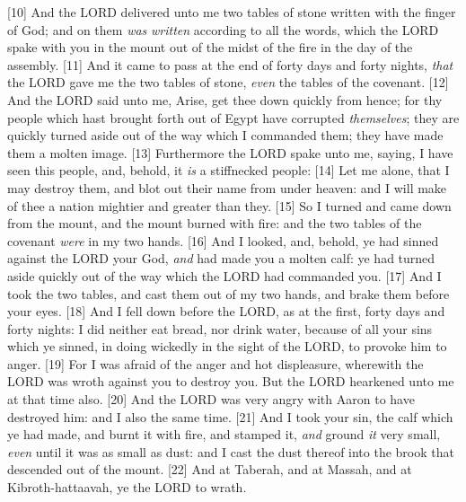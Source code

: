 [10] \textcolor[cmyk]{0.99998,1,0,0}{And the LORD delivered unto me two tables of stone written with the finger of God; and on them \emph{was} \emph{written} according to all the words, which the LORD spake with you in the mount out of the midst of the fire in the day of the assembly.}
[11] \textcolor[cmyk]{0.99998,1,0,0}{And it came to pass at the end of forty days and forty nights, \emph{that} the LORD gave me the two tables of stone, \emph{even} the tables of the covenant.}
[12] \textcolor[cmyk]{0.99998,1,0,0}{And the LORD said unto me, Arise, get thee down quickly from hence; for thy people which  hast brought forth out of Egypt have corrupted \emph{themselves}; they are quickly turned aside out of the way which I commanded them; they have made them a molten image.}
[13] \textcolor[cmyk]{0.99998,1,0,0}{Furthermore the LORD spake unto me, saying, I have seen this people, and, behold, it \emph{is} a stiffnecked people:}
[14] \textcolor[cmyk]{0.99998,1,0,0}{Let me alone, that I may destroy them, and blot out their name from under heaven: and I will make of thee a nation mightier and greater than they.}
[15] \textcolor[cmyk]{0.99998,1,0,0}{So I turned and came down from the mount, and the mount burned with fire: and the two tables of the covenant \emph{were} in my two hands.}
[16] \textcolor[cmyk]{0.99998,1,0,0}{And I looked, and, behold, ye had sinned against the LORD your God, \emph{and} had made you a molten calf: ye had turned aside quickly out of the way which the LORD had commanded you.}
[17] \textcolor[cmyk]{0.99998,1,0,0}{And I took the two tables, and cast them out of my two hands, and brake them before your eyes.}
[18] \textcolor[cmyk]{0.99998,1,0,0}{And I fell down before the LORD, as at the first, forty days and forty nights: I did neither eat bread, nor drink water, because of all your sins which ye sinned, in doing wickedly in the sight of the LORD, to provoke him to anger.}
[19] \textcolor[cmyk]{0.99998,1,0,0}{For I was afraid of the anger and hot displeasure, wherewith the LORD was wroth against you to destroy you. But the LORD hearkened unto me at that time also.}
[20] \textcolor[cmyk]{0.99998,1,0,0}{And the LORD was very angry with Aaron to have destroyed him: and I  also the same time.}
[21] \textcolor[cmyk]{0.99998,1,0,0}{And I took your sin, the calf which ye had made, and burnt it with fire, and stamped it, \emph{and} ground \emph{it} very small, \emph{even} until it was as small as dust: and I cast the dust thereof into the brook that descended out of the mount.}
[22] \textcolor[cmyk]{0.99998,1,0,0}{And at Taberah, and at Massah, and at Kibroth-hattaavah, ye  the LORD to wrath.}
